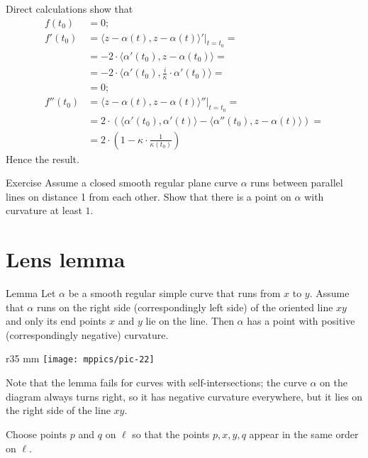 Direct calculations show that
\begin{align*}
f(t_0)&=0;
\\
f'(t_0)&=\left.\langle z-\alpha(t),z-\alpha(t) \rangle'\right|_{t=t_0}=
\\
&=-2\cdot \langle \alpha'(t_0),z-\alpha(t_0) \rangle=
\\&=-2\cdot \langle \alpha'(t_0),\tfrac i\kappa \cdot\alpha'(t_0) \rangle=
\\
&=0;
\\
f''(t_0)&=\langle z-\alpha(t),z-\alpha(t) \rangle''|_{t=t_0}=
\\
&=2\cdot\left( \langle \alpha'(t_0),\alpha'(t) \rangle-\langle \alpha''(t_0),z-\alpha(t) \rangle \right)=
\\
&=2\cdot\left(1-\kappa\cdot \frac1{\kappa(t_0)}\right)
\end{align*}
Hence the result.\qeds


\begin{thm}{Exercise}
Assume a closed smooth regular plane curve $\alpha$ runs between parallel lines on distance 1 from each other.
Show that there is a point on $\alpha$ with curvature at least $1$.
\end{thm}


\section{Lens lemma}

\begin{thm}{Lemma}\label{lem:lens}
Let $\alpha$ be a smooth regular simple curve that runs from $x$ to $y$.
Assume that $\alpha$ runs on the right side (correspondingly left side) of the oriented line $xy$ and only its end points $x$ and $y$ lie on the line.
Then $\alpha$ has a point with positive  (correspondingly negative) curvature.
\end{thm}

\begin{wrapfigure}{r}{35 mm}
\vskip-4mm
\centering
\texttt{[image: mppics/pic-22]}
\vskip0mm
\end{wrapfigure}

Note that the lemma fails for curves with self-intersections;
the curve $\alpha$ on the diagram always turns right, 
so it has negative curvature everywhere, but it lies on the right side of the line $xy$. 

Choose points $p$ and $q$ on $\ell$
so that the points $p, x, y, q$ appear in the same order on $\ell$.


